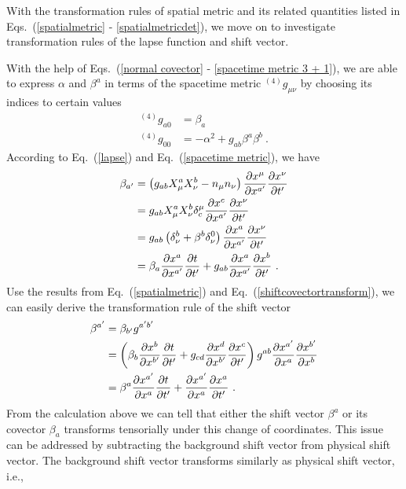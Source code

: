 With the transformation rules of spatial metric and its related quantities listed in Eqs.~(\ref{spatialmetric} - \ref{spatialmetricdet}), we move on to investigate transformation rules of the lapse function and shift vector. 

With the help of Eqs.~(\ref{normal covector} - \ref{spacetime metric 3 + 1}), we are able to express $\alpha$ and $\beta^{a}$ in terms of the spacetime metric $^{\left(4\right)}g_{\mu\nu}$ by choosing its indices to certain values
\begin{align}
^{\left(4\right)}g_{a0} & = \beta_{a}\label{shift}\\
^{\left(4\right)}g_{00} & = -\alpha^2 + g_{ab}\beta^{a}\beta^{b}\label{lapse} \ .
\end{align}
According to Eq.~(\ref{lapse}) and Eq.~(\ref{spacetime metric}), we have
\begin{align}\label{shiftcovectortransform}
\beta_{a'} & = \left(g_{ab}X^{a}_{\mu}X^{b}_{\nu} - n_{\mu}n_{\nu}\right)\frac{\partial x^{\mu}}{\partial x^{a'}}\frac{\partial x^{\nu}}{\partial t'}\notag\\
& = g_{ab}X^{a}_{\mu}X^{b}_{\nu}\delta_{c}^{\mu}\frac{\partial x^{c}}{\partial x^{a'}}\frac{\partial x^{\nu}}{\partial t'}\notag\\
& = g_{ab}\left(\delta^{b}_{\nu} + \beta^{b}\delta^{0}_{\nu}\right)\frac{\partial x^{a}}{\partial x^{a'}}\frac{\partial x^{\nu}}{\partial t'}\notag\\
& = \beta_{a}\frac{\partial x^{a}}{\partial x^{a'}}\frac{\partial t}{\partial t'} + g_{ab}\frac{\partial x^{a}}{\partial x^{a'}}\frac{\partial x^{b}}{\partial t'} \ .
\end{align}
Use the results from Eq.~(\ref{spatialmetric}) and Eq.~(\ref{shiftcovectortransform}), we can easily derive the transformation rule of the shift vector
\begin{align}\label{shiftvectortransform}
\beta^{a'} & = \beta_{b'}g^{a'b'}\notag\\
& = \left(\beta_{b}\frac{\partial x^{b}}{\partial x^{b'}}\frac{\partial t}{\partial t'} + g_{cd}\frac{\partial x^{d}}{\partial x^{b'}}\frac{\partial x^{c}}{\partial t'}\right)g^{ab}\frac{\partial x^{a'}}{\partial x^{a}}\frac{\partial x^{b'}}{\partial x^{b}}\notag\\
& = \beta^{a}\frac{\partial x^{a'}}{\partial x^{a}}\frac{\partial t}{\partial t'} + \frac{\partial x^{a'}}{\partial x^{a}}\frac{\partial x^{a}}{\partial t'} \ .
\end{align}
From the calculation above we can tell that either the shift vector $\beta^{a}$ or its covector $\beta_{a}$ transforms tensorially under this change of coordinates. This issue can be addressed by subtracting the background shift vector from physical shift vector. The background shift vector transforms similarly as physical shift vector, i.e., 
